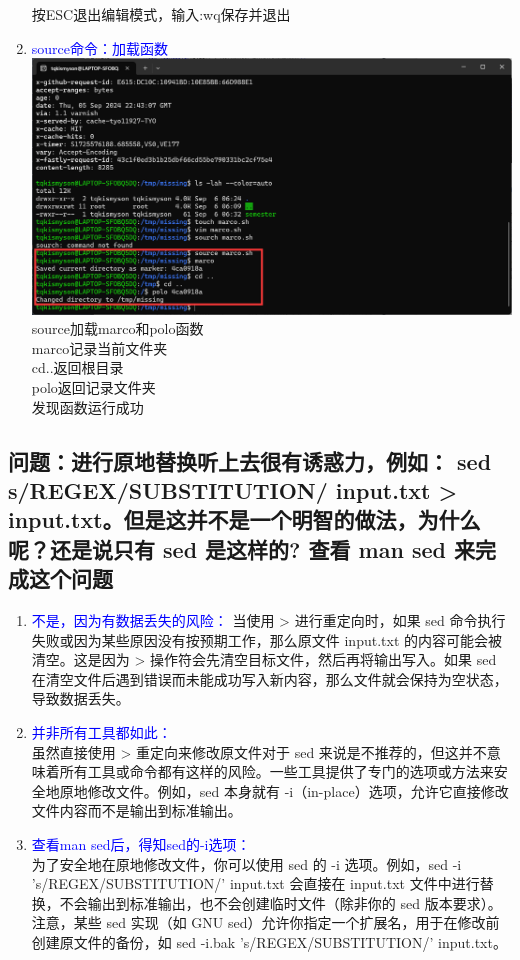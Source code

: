 \documentclass[12pt,a4paper,UTF8]{article}
\begin{document}
\begin{enumerate}
        按ESC退出编辑模式，输入:wq保存并退出\\
        \item \textcolor{blue}{source命令：加载函数}\\[8pt]
        \includegraphics[scale=0.25]{pictures/Shell/6_4.png}
        source加载marco和polo函数\\
        marco记录当前文件夹\\
        cd..返回根目录\\
        polo返回记录文件夹\\
        发现函数运行成功
    \end{enumerate}

    \NoBgThispage
    \subsection{问题：进行原地替换听上去很有诱惑力，例如： sed s/REGEX/SUBSTITUTION/ input.txt > input.txt。但是这并不是一个明智的做法，为什么呢？还是说只有 sed 是这样的? 查看 man sed 来完成这个问题}
    \begin{enumerate}
        \item \textcolor{blue}{不是，因为有数据丢失的风险：}
        当使用 > 进行重定向时，如果 sed 命令执行失败或因为某些原因没有按预期工作，那么原文件 input.txt 的内容可能会被清空。这是因为 > 操作符会先清空目标文件，然后再将输出写入。如果 sed 在清空文件后遇到错误而未能成功写入新内容，那么文件就会保持为空状态，导致数据丢失。
        \item \textcolor{blue}{并非所有工具都如此：}\\
        虽然直接使用 > 重定向来修改原文件对于 sed 来说是不推荐的，但这并不意味着所有工具或命令都有这样的风险。一些工具提供了专门的选项或方法来安全地原地修改文件。例如，sed 本身就有 -i（in-place）选项，允许它直接修改文件内容而不是输出到标准输出。
        \item \textcolor{blue}{查看man sed后，得知sed的-i选项：}\\
        为了安全地在原地修改文件，你可以使用 sed 的 -i 选项。例如，sed -i 's/REGEX/SUBSTITUTION/' input.txt 会直接在 input.txt 文件中进行替换，不会输出到标准输出，也不会创建临时文件（除非你的 sed 版本要求）。注意，某些 sed 实现（如 GNU sed）允许你指定一个扩展名，用于在修改前创建原文件的备份，如 sed -i.bak 's/REGEX/SUBSTITUTION/' input.txt。
    \end{enumerate}
\end{document}

